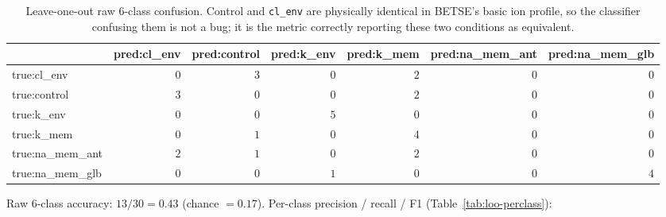 \documentclass[11pt,a4paper]{article}
\begin{document}
\begin{table}[h]\centering\scriptsize
\caption{Leave-one-out raw $6$-class confusion. Control and \texttt{cl\_env} are physically identical in BETSE's basic ion profile, so the classifier confusing them is not a bug; it is the metric correctly reporting these two conditions as equivalent.}\label{tab:loo-raw}
\begin{tabular}{lrrrrrr}\toprule
                   & pred:cl\_env & pred:control & pred:k\_env & pred:k\_mem & pred:na\_mem\_ant & pred:na\_mem\_glb \\
\midrule
true:cl\_env       & $0$ & $3$ & $0$ & $2$ & $0$ & $0$ \\
true:control       & $3$ & $0$ & $0$ & $2$ & $0$ & $0$ \\
true:k\_env        & $0$ & $0$ & $5$ & $0$ & $0$ & $0$ \\
true:k\_mem        & $0$ & $1$ & $0$ & $4$ & $0$ & $0$ \\
true:na\_mem\_ant  & $2$ & $1$ & $0$ & $2$ & $0$ & $0$ \\
true:na\_mem\_glb  & $0$ & $0$ & $1$ & $0$ & $0$ & $4$ \\
\bottomrule\end{tabular}
\end{table}

Raw $6$-class accuracy: $13/30 = 0.43$ (chance $=0.17$). Per-class precision / recall / F1 (Table~\ref{tab:loo-perclass}):
\end{document}
